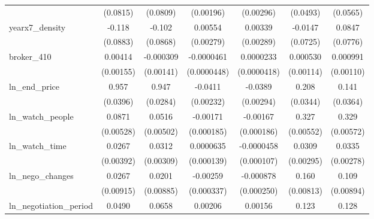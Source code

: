 {\begin{tabular}{l*{6}{c}}
            &    (0.0815)         &    (0.0809)         &   (0.00196)         &   (0.00296)         &    (0.0493)         &    (0.0565)         \\
\addlinespace
yearx7\_density&      -0.118         &      -0.102         &     0.00554\sym{**} &     0.00339         &     -0.0147         &      0.0847         \\
            &    (0.0883)         &    (0.0868)         &   (0.00279)         &   (0.00289)         &    (0.0725)         &    (0.0776)         \\
\addlinespace
broker\_410  &     0.00414\sym{***}&   -0.000309         &  -0.0000461         &   0.0000233         &    0.000530         &    0.000991         \\
            &   (0.00155)         &   (0.00141)         & (0.0000448)         & (0.0000418)         &   (0.00114)         &   (0.00110)         \\
\addlinespace
ln\_end\_price&       0.957\sym{***}&       0.947\sym{***}&     -0.0411\sym{***}&     -0.0389\sym{***}&       0.208\sym{***}&       0.141\sym{***}\\
            &    (0.0396)         &    (0.0284)         &   (0.00232)         &   (0.00294)         &    (0.0344)         &    (0.0364)         \\
\addlinespace
ln\_watch\_people&      0.0871\sym{***}&      0.0516\sym{***}&    -0.00171\sym{***}&    -0.00167\sym{***}&       0.327\sym{***}&       0.329\sym{***}\\
            &   (0.00528)         &   (0.00502)         &  (0.000185)         &  (0.000186)         &   (0.00552)         &   (0.00572)         \\
\addlinespace
ln\_watch\_time&      0.0267\sym{***}&      0.0312\sym{***}&   0.0000635         &  -0.0000458         &      0.0309\sym{***}&      0.0335\sym{***}\\
            &   (0.00392)         &   (0.00309)         &  (0.000139)         &  (0.000107)         &   (0.00295)         &   (0.00278)         \\
\addlinespace
ln\_nego\_changes&      0.0267\sym{***}&      0.0201\sym{**} &    -0.00259\sym{***}&   -0.000878\sym{***}&       0.160\sym{***}&       0.109\sym{***}\\
            &   (0.00915)         &   (0.00885)         &  (0.000337)         &  (0.000250)         &   (0.00813)         &   (0.00894)         \\
\addlinespace
ln\_negotiation\_period&      0.0490\sym{***}&      0.0658\sym{***}&     0.00206\sym{***}&     0.00156\sym{***}&       0.123\sym{***}&       0.128\sym{***}\\

\end{tabular}}
